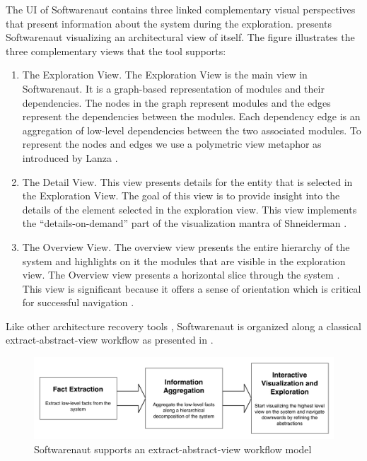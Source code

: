 \documentclass[preprint,12pt]{elsarticle}
\begin{document}
The UI of Softwarenaut contains three linked complementary visual perspectives that present information about the system during the exploration.  presents Softwarenaut visualizing an architectural view of itself. The figure illustrates the three complementary views that the tool supports:

\begin{enumerate}
\item The Exploration View. The Exploration View is the main view in Softwarenaut. It is a graph-based representation of modules and their dependencies. The nodes in the graph represent modules and the edges represent the dependencies between the modules. Each dependency edge is an aggregation of low-level dependencies between the two associated modules. To represent the nodes and edges we use a polymetric view metaphor as introduced by Lanza \cite{lanza-pv, lanza-oomp}. 

\item The Detail View. This view presents details for the entity that is selected in the Exploration View. The goal of this view is to provide insight into the details of the element selected in the exploration view. This view implements the ``details-on-demand'' part of the visualization mantra of Shneiderman \cite{shneid-eyes}.

\item The Overview View. The overview view presents the entire hierarchy of the system and highlights on it the modules that are visible in the exploration view. The Overview view presents a horizontal slice through the system \cite{wong-thesis}. %
This view is significant because it offers a sense of orientation which is critical for successful navigation \cite{storey-awareness}.

\end{enumerate}


Like other architecture recovery tools \cite{pollet-sar}, Softwarenaut is organized along a classical extract-abstract-view workflow as presented in .

\begin{figure}[h]
\begin{center}
\includegraphics[width=\linewidth]{images/SnautFlow}
\caption{Softwarenaut supports an extract-abstract-view workflow model}
\end{center}
\end{figure}
\end{document}
